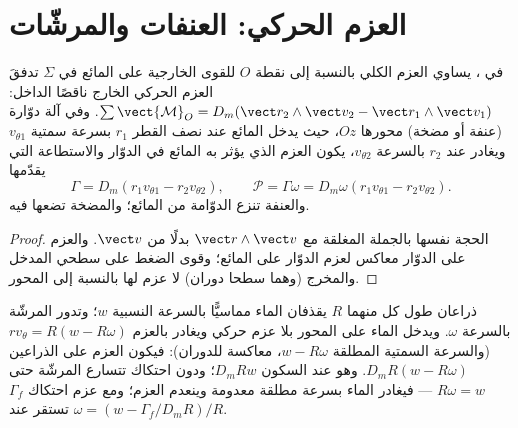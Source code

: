 \section{العزم الحركي: العنفات والمرشّات}

\begin{theorem}\label{thm:b2:flow-balances:angular}
في ، يساوي العزم الكلي بالنسبة إلى نقطة $O$ للقوى
الخارجية على المائع في $\Sigma$ تدفقَ العزم الحركي
الخارج ناقصًا الداخل: $\sum\vect{\mathcal M}_O = D_m(\vect r_2\wedge\vect v_2 - \vect r_1
\wedge\vect v_1)$. وفي آلة دوّارة (عنفة أو مضخة) محورها $Oz$،
حيث يدخل المائع عند نصف القطر $r_1$ بسرعة سمتية
$v_{\theta1}$ ويغادر عند $r_2$ بالسرعة $v_{\theta2}$، يكون العزم الذي
يؤثر به المائع في الدوّار والاستطاعة التي يقدّمها
\[
\Gamma = D_m(r_1v_{\theta1} - r_2v_{\theta2}) , \qquad
\mathcal P = \Gamma\omega = D_m\omega(r_1v_{\theta1} - r_2v_{\theta2}) .
\]
والعنفة تنزع الدوّامة من المائع؛ والمضخة تضعها فيه.
\end{theorem}

\begin{proof}
الحجة نفسها بالجملة المغلقة مع $\vect r\wedge\vect v$ بدلًا من
$\vect v$. والعزم على الدوّار معاكس لعزم
الدوّار على المائع؛ وقوى الضغط على سطحي المدخل والمخرج
(وهما سطحا دوران) لا عزم لها بالنسبة إلى
المحور.
\end{proof}

\begin{example}\label{ex:b2:flow-balances:sprinkler}
ذراعان طول كل منهما $R$ يقذفان الماء مماسيًّا بالسرعة النسبية
$w$؛ وتدور المرشّة بالسرعة $\omega$. ويدخل الماء على المحور بلا
عزم حركي ويغادر بالعزم $r v_\theta = R(w - R\omega)$ (والسرعة
السمتية المطلقة $w - R\omega$، معاكسة للدوران): فيكون العزم على
الذراعين $D_mR(w - R\omega)$. وهو عند السكون $D_mRw$؛ ودون احتكاك
تتسارع المرشّة حتى $R\omega = w$ --- فيغادر الماء بسرعة مطلقة
معدومة وينعدم العزم؛ ومع عزم احتكاك
$\Gamma_f$ تستقر عند $\omega = (w - \Gamma_f/D_mR)/R$.
\end{example}

